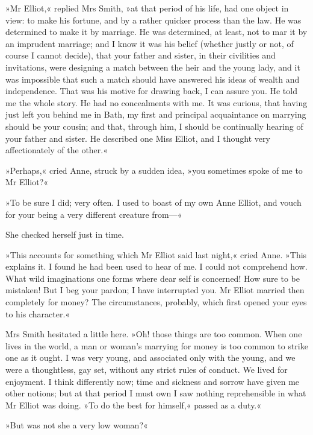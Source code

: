 »Mr Elliot,« replied Mrs Smith, »at that period of his life, had one object in view: to make his fortune, and by a rather quicker process than the law. He was determined to make it by marriage. He was determined, at least, not to mar it by an imprudent marriage; and I know it was his belief (whether justly or not, of course I cannot decide), that your father and sister, in their civilities and invitations, were designing a match between the heir and the young lady, and it was impossible that such a match should have answered his ideas of wealth and independence. That was his motive for drawing back, I can assure you. He told me the whole story. He had no concealments with me. It was curious, that having just left you behind me in Bath, my first and principal acquaintance on marrying should be your cousin; and that, through him, I should be continually hearing of your father and sister. He described one Miss Elliot, and I thought very affectionately of the other.«

»Perhaps,« cried Anne, struck by a sudden idea, »you sometimes spoke of me to Mr Elliot?«

»To be sure I did; very often. I used to boast of my own Anne Elliot, and vouch for your being a very different creature from—«

She checked herself just in time.

»This accounts for something which Mr Elliot said last night,« cried Anne. »This explains it. I found he had been used to hear of me. I could not comprehend how. What wild imaginations one forms where dear self is concerned! How sure to be mistaken! But I beg your pardon; I have interrupted you. Mr Elliot married then completely for money? The circumstances, probably, which first opened your eyes to his character.«

Mrs Smith hesitated a little here. »Oh! those things are too common. When one lives in the world, a man or woman's marrying for money is too common to strike one as it ought. I was very young, and associated only with the young, and we were a thoughtless, gay set, without any strict rules of conduct. We lived for enjoyment. I think differently now; time and sickness and sorrow have given me other notions; but at that period I must own I saw nothing reprehensible in what Mr Elliot was doing. »To do the best for himself,« passed as a duty.«

»But was not she a very low woman?«

